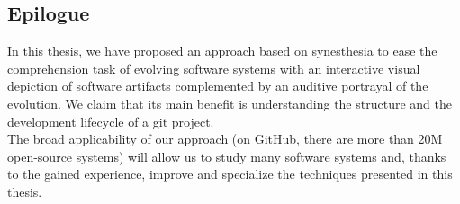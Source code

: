 \subsection*{Epilogue}
In this thesis, we have proposed an approach based on synesthesia to ease the comprehension task of evolving software systems with an interactive visual depiction of software artifacts complemented by an auditive portrayal of the evolution. We claim that its main benefit is understanding the structure and the development lifecycle of a git project. \\
The broad applicability of our approach  (on GitHub, there are more than 20M open-source systems) will allow us to study many software systems and, thanks to the gained experience, improve and specialize the techniques presented in this thesis.  